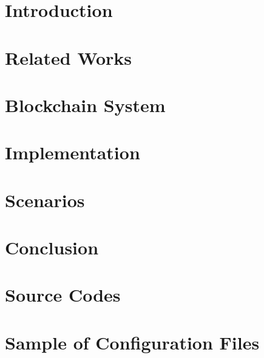 \documentclass[12pt,twoside,openright]{report}
\makeatletter
\def\cleardoublepage{\clearpage\if@twoside \ifodd\c@page\else
    \hbox{}
    \thispagestyle{empty}
    \newpage
    \if@twocolumn\hbox{}\newpage\fi\fi\fi}
\makeatother
\begin{document}

\cleardoublepage


\cleardoublepage


\cleardoublepage


\cleardoublepage

\tableofcontents

\listoffigures
 
\listoftables


\chapter{Introduction}


\chapter{Related Works}


\chapter{Blockchain System}


\chapter{Implementation}


\chapter{Scenarios}


\chapter{Conclusion}





\appendix
\chapter{Source Codes}


\appendix
\chapter{Sample of Configuration Files}

\end{document}
